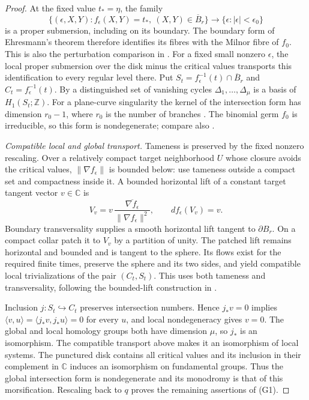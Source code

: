 \documentclass[11pt]{article}
\numberwithin{equation}{section}
\theoremstyle{definition}
\theoremstyle{remark}
\newcommand{\C}{\mathbb C}\newcommand{\Q}{\mathbb Q}\newcommand{\R}{\mathbb R}\newcommand{\Z}{\mathbb Z}
\begin{document}
\begin{proof}
At the fixed value $t_* =\eta$, the family
\[
 \{(\epsilon,X,Y):f_\epsilon(X,Y)=t_*,\ (X,Y)\in\overline B_r\}
 \longrightarrow\{\epsilon:|\epsilon|<\epsilon_0\}
\]
is a proper submersion, including on its boundary. The boundary form of
Ehresmann's theorem therefore identifies its fibres with the Milnor fibre of
$f_0$. This is also the perturbation comparison in \cite[\S2.1,
pp.~29--31]{AGV}. For a fixed small nonzero $\epsilon$, the local proper
submersion over the disk minus the critical values transports this
identification to every regular level there. Put
$S_t=f_\epsilon^{-1}(t)\cap\overline B_r$ and $C_t=f_\epsilon^{-1}(t)$.
By \cite[Theorem~2.1, p.~31]{AGV} a distinguished set of vanishing cycles
$\Delta_1,\ldots,\Delta_\mu$ is a basis of $H_1(S_t;\Z)$.
For a plane-curve singularity the kernel of the intersection form has
dimension $r_0-1$, where $r_0$ is the number of branches
\cite[\S3.6, p.~100]{AGV}. The binomial germ $f_0$ is irreducible, so this
form is nondegenerate; compare also \cite[p.~411, Example~2]{AGV}.

\emph{Compatible local and global transport.} Tameness is preserved by the
fixed nonzero rescaling. Over a relatively compact target neighborhood $U$
whose closure avoids the critical values, $\|\nabla f_\epsilon\|$ is bounded
below: use tameness outside a compact set and compactness inside it.
A bounded horizontal lift of a constant target tangent vector $v\in\C$ is
\[
 V_v=v\,\frac{\overline{\nabla f_\epsilon}}{\|\nabla f_\epsilon\|^2},
 \qquad df_\epsilon(V_v)=v.
\]
Boundary transversality supplies a smooth horizontal lift tangent to
$\partial B_r$. On a compact collar patch it to $V_v$ by a partition of unity.
The patched lift remains horizontal and bounded and is tangent to the sphere.
Its flows exist for the required finite times, preserve the sphere and its two
sides, and yield compatible local trivializations of the pair $(C_t,S_t)$.
This uses both tameness and transversality, following the bounded-lift
construction in \cite[pp.~229--230]{Br}.

Inclusion $j:S_t\hookrightarrow C_t$ preserves intersection numbers. Hence
$j_*v=0$ implies $\langle v,u\rangle=\langle j_*v,j_*u\rangle=0$ for every $u$,
and local nondegeneracy gives $v=0$. The global and local homology groups both
have dimension $\mu$, so $j_*$ is an isomorphism. The compatible transport
above makes it an isomorphism of local systems. The punctured disk contains
all critical values and its inclusion in their complement in $\C$ induces an
isomorphism on fundamental groups. Thus the global intersection form is
nondegenerate and its monodromy is that of this morsification. Rescaling back
to $q$ proves the remaining assertions of (G1).


\end{proof}
\end{document}
